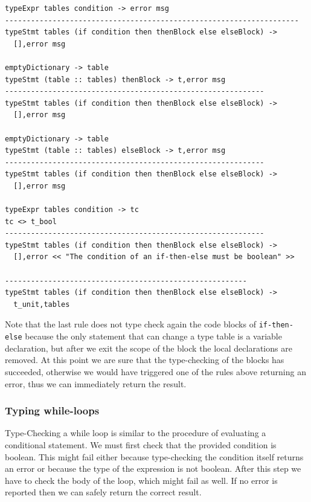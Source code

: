 \begin{lstlisting}
typeExpr tables condition -> error msg
--------------------------------------------------------------------
typeStmt tables (if condition then thenBlock else elseBlock) -> 
  [],error msg

emptyDictionary -> table
typeStmt (table :: tables) thenBlock -> t,error msg
------------------------------------------------------------
typeStmt tables (if condition then thenBlock else elseBlock) -> 
  [],error msg

emptyDictionary -> table
typeStmt (table :: tables) elseBlock -> t,error msg
------------------------------------------------------------
typeStmt tables (if condition then thenBlock else elseBlock) -> 
  [],error msg

typeExpr tables condition -> tc
tc <> t_bool
------------------------------------------------------------
typeStmt tables (if condition then thenBlock else elseBlock) ->
  [],error << "The condition of an if-then-else must be boolean" >>

--------------------------------------------------------
typeStmt tables (if condition then thenBlock else elseBlock) ->
  t_unit,tables
\end{lstlisting}

Note that the last rule does not type check again the code blocks of \texttt{if-then-else} because the only statement that can change a type table is a variable declaration, but after we exit the scope of the block the local declarations are removed. At this point we are sure that the type-checking of the blocks has succeeded, otherwise we would have triggered one of the rules above returning an error, thus we can immediately return the result.

\subsubsection{Typing while-loops}
Type-Checking a while loop is similar to the procedure of evaluating a conditional statement. We must first check that the provided condition is boolean. This might fail either because type-checking the condition itself returns an error or because the type of the expression is not boolean. After this step we have to check the body of the loop, which might fail as well. If no error is reported then we can safely return the correct result.

